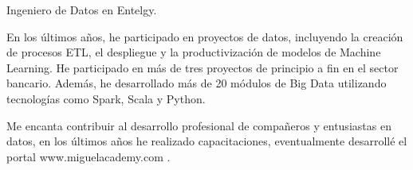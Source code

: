 

\begin{cvparagraph}


Ingeniero de Datos en Entelgy.

En los \'ultimos años, he participado en proyectos de datos, incluyendo la creaci\'on de procesos ETL, el despliegue y la productivizaci\'on de modelos de Machine Learning.
He participado en m\'as de tres proyectos de principio a fin en el sector bancario.
Adem\'as, he desarrollado m\'as de 20 m\'odulos de Big Data utilizando tecnolog\'ias como Spark, Scala y Python.


Me encanta contribuir al desarrollo profesional de compañeros y entusiastas en datos,
en los \'ultimos años he realizado capacitaciones, eventualmente desarroll\'e el portal www.miguelacademy.com .

\end{cvparagraph}
